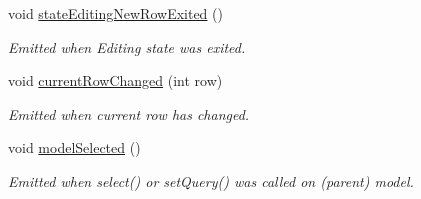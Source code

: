 \begin{DoxyCompactItemize}
void \hyperlink{classmdt_abstract_sql_widget_af4ed2a005f55ffe23ce6382f1ed3f68e}{state\-Editing\-New\-Row\-Exited} ()
\begin{DoxyCompactList}\small\item\em Emitted when Editing state was exited. \end{DoxyCompactList}\item 
void \hyperlink{classmdt_abstract_sql_widget_a182972cd54cf7e00322c0b6973ecbde2}{current\-Row\-Changed} (int row)
\begin{DoxyCompactList}\small\item\em Emitted when current row has changed. \end{DoxyCompactList}\item 
void \hyperlink{classmdt_abstract_sql_widget_a6787c093d9b0b64a1e8d3794ba505604}{model\-Selected} ()
\begin{DoxyCompactList}\small\item\em Emitted when select() or set\-Query() was called on (parent) model. \end{DoxyCompactList}\end{DoxyCompactItemize}

